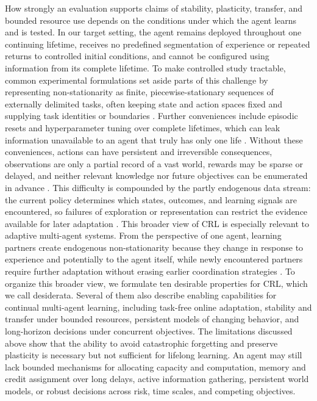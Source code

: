 \documentclass[10pt,journal,compsoc]{IEEEtran}
\begin{document}
How strongly an evaluation supports claims of stability, plasticity, transfer, and bounded resource use depends on the conditions under which the agent learns and is tested.
In our target setting, the agent remains deployed throughout one continuing lifetime, receives no predefined segmentation of experience or repeated returns to controlled initial conditions, and cannot be configured using information from its complete lifetime.
To make controlled study tractable, common experimental formulations set aside parts of this challenge by representing non-stationarity as finite, piecewise-stationary sequences of externally delimited tasks, often keeping state and action spaces fixed and supplying task identities or boundaries \cite{khetarpal2022,wolczyk2021,powers2022}.
Further conveniences include episodic resets \cite{sharma2022} and hyperparameter tuning over complete lifetimes, which can leak information unavailable to an agent that truly has only one life \cite{mesbahi2025,chen2022,bible1611}.
Without these conveniences, actions can have persistent and irreversible consequences, observations are only a partial record of a vast world, rewards may be sparse or delayed, and neither relevant knowledge nor future objectives can be enumerated in advance \cite{schaul2018,khetarpal2022}.
This difficulty is compounded by the partly endogenous data stream: the current policy determines which states, outcomes, and learning signals are encountered, so failures of exploration or representation can restrict the evidence available for later adaptation \cite{khetarpal2022,abel2023}.
This broader view of CRL is especially relevant to adaptive multi-agent systems.
From the perspective of one agent, learning partners create endogenous non-stationarity because they change in response to experience and potentially to the agent itself, while newly encountered partners require further adaptation without erasing earlier coordination strategies \cite{nekoei2021,kim2021}.
To organize this broader view, we formulate ten desirable properties for CRL, which we call desiderata.
Several of them also describe enabling capabilities for continual multi-agent learning, including task-free online adaptation, stability and transfer under bounded resources, persistent models of changing behavior, and long-horizon decisions under concurrent objectives.
The limitations discussed above show that the ability to avoid catastrophic forgetting and preserve plasticity is necessary but not sufficient for lifelong learning.
An agent may still lack bounded mechanisms for allocating capacity and computation, memory and credit assignment over long delays, active information gathering, persistent world models, or robust decisions across risk, time scales, and competing objectives.
\end{document}
